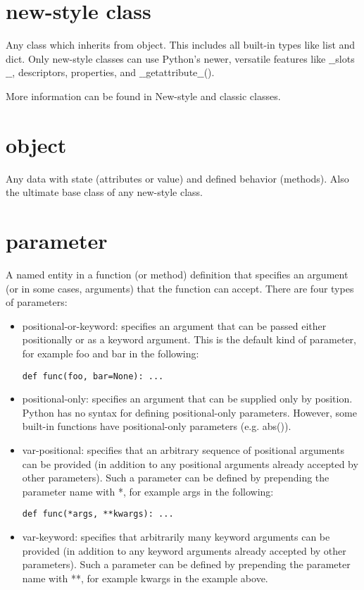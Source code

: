 \documentclass[12pt,a4paper,final,twoside,onecolumn,titlepage]{book}
\begin{document}
\section{new-style class}
Any class which inherits from object. This includes all built-in types like list and dict. Only new-style classes can use Python’s newer, versatile features like $\_\_$slots$\_\_$, descriptors, properties, and $\_\_$getattribute$\_\_$().

More information can be found in New-style and classic classes.

\section{object}
Any data with state (attributes or value) and defined behavior (methods). Also the ultimate base class of any new-style class.

\section{parameter}
A named entity in a function (or method) definition that specifies an argument (or in some cases, arguments) that the function can accept. There are four types of parameters:
\begin{itemize}
\item positional-or-keyword: specifies an argument that can be passed either positionally or as a keyword argument. This is the default kind of parameter, for example foo and bar in the following:
\begin{lstlisting}
def func(foo, bar=None): ...
\end{lstlisting}
\item positional-only: specifies an argument that can be supplied only by position. Python has no syntax for defining positional-only parameters. However, some built-in functions have positional-only parameters (e.g. abs()).

\item var-positional: specifies that an arbitrary sequence of positional arguments can be provided (in addition to any positional arguments already accepted by other parameters). Such a parameter can be defined by prepending the parameter name with *, for example args in the following:
\begin{lstlisting}
def func(*args, **kwargs): ...
\end{lstlisting}
\item var-keyword: specifies that arbitrarily many keyword arguments can be provided (in addition to any keyword arguments already accepted by other parameters). Such a parameter can be defined by prepending the parameter name with **, for example kwargs in the example above.
\end{itemize}
\end{document}
